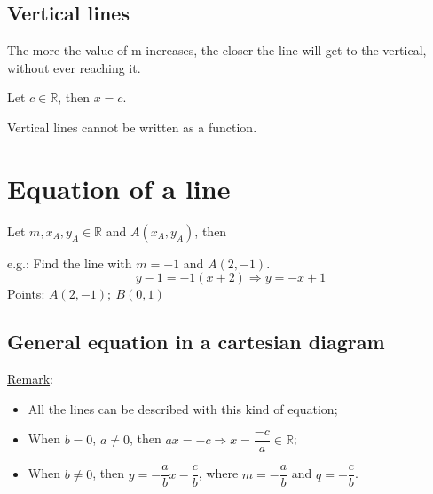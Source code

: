 \documentclass{article}
\newcommand{\figbox}[1]{ 
    \begin{figure*}[ht!]        
        \begin{center}            
            \fbox{#1}        
        \end{center}    
    \end{figure*}
}
\newcommand{\rem}{\underline{Remark}: }
\begin{document}
\subsection{Vertical lines}
The more the value of m increases, the closer the line will get to the vertical,
without ever reaching it.

Let $c \in \mathbb{R}$, then $x=c$.

Vertical lines cannot be written as a function.

\section{Equation of a line}
Let $m,x_A,y_A \in \mathbb{R}$ and $A(x_A, y_A)$, then
\figbox{$y-y_A=m(x-x_A)$}

e.g.: Find the line with $m=-1$ and $A(2,-1)$.
\[
    y-1=-1(x+2) \Rightarrow y=-x+1
\]
\hspace{.75cm} Points: $A(2,-1);\ B(0,1)$


\begin{center}
\end{center}

\subsection{General equation in a cartesian diagram}
\figbox{$ax+by+c=0$}

\rem{\begin{itemize}
    \item All the lines can be described with this kind of equation;
    \item When $b=0$, $a \neq 0$, then $ax=-c \Rightarrow x=\dfrac{-c}{a} \in \mathbb{R}$;
    \item When $b \neq 0$, then $y=-\dfrac{a}{b}x -\dfrac{c}{b}$,
        where $m=-\dfrac{a}{b}$ and $q=-\dfrac{c}{b}$.
\end{itemize}}
\end{document}

